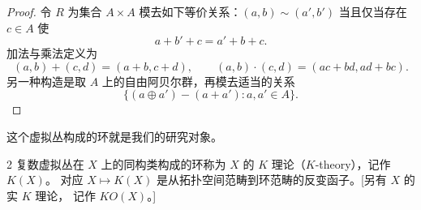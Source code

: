 \begin{proof}
  令 $R$ 为集合 $A\times A$ 模去如下等价关系：$(a,b)\sim(a',b')$ 当且仅当存在 $c\in A$ 使
  \[ a+b'+c=a'+b+c . \]
  加法与乘法定义为
  \[ (a,b)+(c,d)=(a+b,c+d),\qquad (a,b)\cdot(c,d)=(ac+bd,ad+bc). \]
  另一种构造是取 $A$ 上的自由阿贝尔群，再模去适当的关系
  \[ \{(a\oplus a')-(a+a') : a,a'\in A\}. \]
\end{proof}

这个虚拟丛构成的环就是我们的研究对象。

\begin{defn}{2}
  复数虚拟丛在 $X$ 上的同构类构成的环称为 $X$ 的 $K$ 理论（$K$-theory），记作 $K(X)$。
  对应 $X\mapsto K(X)$ 是从拓扑空间范畴到环范畴的反变函子。[另有 $X$ 的实 $K$ 理论，
  记作 $KO(X)$。]
\end{defn}
